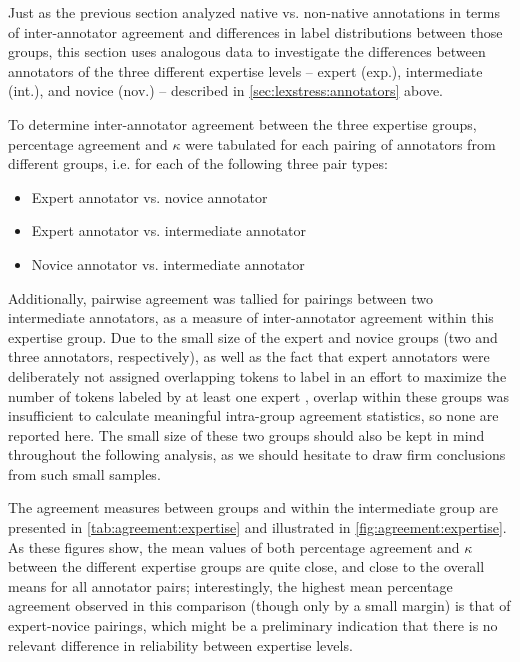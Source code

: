 	
	Just as the previous section analyzed native vs. non-native annotations in terms of inter-annotator agreement and differences in label distributions between those groups, this section uses analogous data to investigate the differences between annotators of the three different expertise levels -- expert (exp.), intermediate (int.), and novice (nov.) -- described in \cref{sec:lexstress:annotators} above.
	
	To determine inter-annotator agreement between the three expertise groups, percentage agreement and $\kappa$ were tabulated for each pairing of annotators from different groups, i.e. for each of the following three pair types:
	
	\begin{itemize}
	\item{Expert annotator vs. novice annotator}
	\item{Expert annotator vs. intermediate annotator}
	\item{Novice annotator vs. intermediate annotator}
	\end{itemize}
	
	Additionally, pairwise agreement was tallied for pairings between two intermediate annotators, as a measure of inter-annotator agreement within this expertise group. Due to the small size of the expert and novice groups (two and three annotators, respectively), as well as the fact that expert annotators were deliberately not assigned overlapping tokens to label in an effort to maximize the number of tokens labeled by at least one expert , overlap within these groups was insufficient to calculate meaningful intra-group agreement statistics, so none are reported here. The small size of these two groups should also be kept in mind throughout the following analysis, as we should hesitate to draw firm conclusions from such small samples. 
		
		The agreement measures between groups and within the intermediate group are presented in \cref{tab:agreement:expertise} and illustrated in \cref{fig:agreement:expertise}. As these figures show, the mean values of both percentage agreement and $\kappa$ between the different expertise groups are quite close, and close to the overall means for all annotator pairs;  interestingly, the highest mean percentage agreement observed in this comparison (though only by a small margin) is that of expert-novice pairings, which might be a preliminary indication that there is no relevant difference in reliability between expertise levels. 
			
